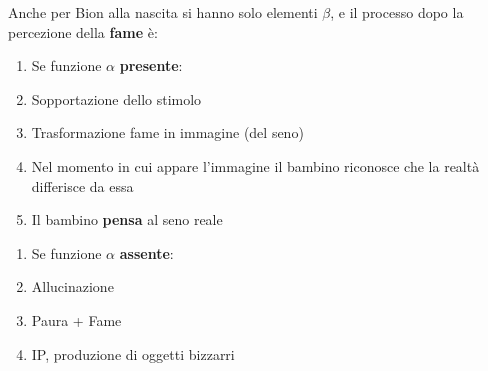 \documentclass[12pt, a4paper]{article}
\begin{document}
Anche per Bion alla nascita si hanno solo elementi $\beta$, e il processo dopo la percezione della \textbf{fame} \`e:
\begin{enumerate}
    \item Se funzione $\alpha$ \textbf{presente}:
    \item Sopportazione dello stimolo
    \item Trasformazione fame in immagine (del seno)
    \item Nel momento in cui appare l'immagine il bambino riconosce che la realt\`a differisce da essa
    \item Il bambino \textbf{pensa} al seno reale
\end{enumerate}
\bigskip
\begin{enumerate}
    \item Se funzione $\alpha$ \textbf{assente}:
    \item Allucinazione
    \item Paura + Fame
    \item IP, produzione di oggetti bizzarri
\end{enumerate}
\end{document}
